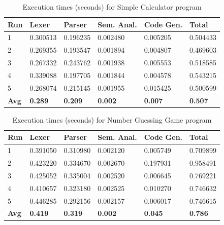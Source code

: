 \documentclass[conference]{IEEEtran}
\begin{document}
\begin{table}[H]
	\centering
	\caption{Execution times (seconds) for Simple Calculator program}
	\label{tab:performance_results_prog1}
	\scriptsize %
	\setlength{\tabcolsep}{3pt} %
	\begin{tabular}{@{}llllll@{}}
		\toprule
		\textbf{Run} & \textbf{Lexer} & \textbf{Parser} & \textbf{Sem. Anal.} & \textbf{Code Gen.} & \textbf{Total} \\
		\midrule
		1 & 0.300513 & 0.196235 & 0.002480 & 0.005205 & 0.504433 \\
		2 & 0.269355 & 0.193547 & 0.001894 & 0.004807 & 0.469603 \\
		3 & 0.267332 & 0.243762 & 0.001938 & 0.005553 & 0.518585 \\
		4 & 0.339088 & 0.197705 & 0.001844 & 0.004578 & 0.543215 \\
		5 & 0.268074 & 0.215145 & 0.001955 & 0.015425 & 0.500599 \\
		\midrule
		\textbf{Avg} & \textbf{0.289} & \textbf{0.209} & \textbf{0.002} & \textbf{0.007} & \textbf{0.507} \\
		\bottomrule
	\end{tabular}
\end{table}

\begin{table}[H]
	\centering
	\caption{Execution times (seconds) for Number Guessing Game program}
	\label{tab:performance_results_prog2}
	\scriptsize %
	\setlength{\tabcolsep}{3pt} %
	\begin{tabular}{@{}llllll@{}}
		\toprule
		\textbf{Run} & \textbf{Lexer} & \textbf{Parser} & \textbf{Sem. Anal.} & \textbf{Code Gen.} & \textbf{Total} \\
		\midrule
		1 & 0.391050 & 0.310980 & 0.002120 & 0.005749 & 0.709899 \\
		2 & 0.423220 & 0.334670 & 0.002670 & 0.197931 & 0.958491 \\
		3 & 0.425052 & 0.335004 & 0.002520 & 0.006645 & 0.769221 \\
		4 & 0.410657 & 0.323180 & 0.002525 & 0.010270 & 0.746632 \\
		5 & 0.446285 & 0.292156 & 0.002157 & 0.006017 & 0.746615 \\
		\midrule
		\textbf{Avg} & \textbf{0.419} & \textbf{0.319} & \textbf{0.002} & \textbf{0.045} & \textbf{0.786} \\
		\bottomrule
	\end{tabular}
\end{table}
\end{document}
